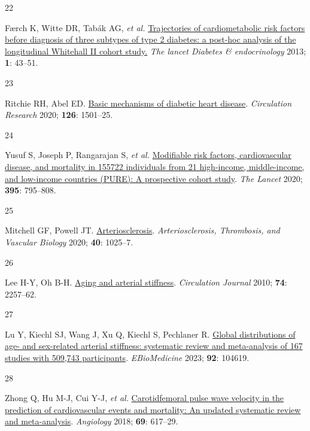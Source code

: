 \documentclass[
  a4paper,
  headsepline=true,
  open=any]{scrbook}
\newlength{\cslhangindent}
\newlength{\csllabelwidth}
\newlength{\cslentryspacingunit} %
\newenvironment{CSLReferences}[2] %
 {%
  \setlength{\parindent}{0pt}
  \ifodd #1
  \let\oldpar\par
  \def\par{\hangindent=\cslhangindent\oldpar}
  \fi
  \setlength{\parskip}{#2\cslentryspacingunit}
 }%
 {}
\newcommand{\CSLLeftMargin}[1]{\parbox[t]{\csllabelwidth}{#1}}
\newcommand{\CSLRightInline}[1]{\parbox[t]{\linewidth - \csllabelwidth}{#1}\break}
\begin{document}
\begin{CSLReferences}{0}{0}
\leavevmode{}%
\CSLLeftMargin{22 }%
\CSLRightInline{Færch K, Witte DR, Tabák AG, \emph{et al.}
\href{https://doi.org/10.1016/S2213-8587(13)70008-1}{Trajectories of
cardiometabolic risk factors before diagnosis of three subtypes of type
2 diabetes: a post-hoc analysis of the longitudinal Whitehall II cohort
study.} \emph{The lancet Diabetes \& endocrinology} 2013; \textbf{1}:
43--51.}

\leavevmode{}%
\CSLLeftMargin{23 }%
\CSLRightInline{Ritchie RH, Abel ED.
\href{https://doi.org/10.1161/CIRCRESAHA.120.315913}{Basic mechanisms of
diabetic heart disease}. \emph{Circulation Research} 2020; \textbf{126}:
1501--25.}

\leavevmode{}%
\CSLLeftMargin{24 }%
\CSLRightInline{Yusuf S, Joseph P, Rangarajan S, \emph{et al.}
\href{https://doi.org/10.1016/S0140-6736(19)32008-2}{Modifiable risk
factors, cardiovascular disease, and mortality in 155{\hphantom{,}}722
individuals from 21 high-income, middle-income, and low-income countries
(PURE): A prospective cohort study}. \emph{The Lancet} 2020;
\textbf{395}: 795--808.}

\leavevmode{}%
\CSLLeftMargin{25 }%
\CSLRightInline{Mitchell GF, Powell JT.
\href{https://doi.org/10.1161/ATVBAHA.120.314208}{Arteriosclerosis}.
\emph{Arteriosclerosis, Thrombosis, and Vascular Biology} 2020;
\textbf{40}: 1025--7.}

\leavevmode{}%
\CSLLeftMargin{26 }%
\CSLRightInline{Lee H-Y, Oh B-H.
\href{https://doi.org/10.1253/circj.CJ-10-0910}{Aging and arterial
stiffness}. \emph{Circulation Journal} 2010; \textbf{74}: 2257--62.}

\leavevmode{}%
\CSLLeftMargin{27 }%
\CSLRightInline{Lu Y, Kiechl SJ, Wang J, Xu Q, Kiechl S, Pechlaner R.
\href{https://doi.org/10.1016/j.ebiom.2023.104619}{Global distributions
of age- and sex-related arterial stiffness: systematic review and
meta-analysis of 167 studies with 509,743 participants}.
\emph{EBioMedicine} 2023; \textbf{92}: 104619.}

\leavevmode{}%
\CSLLeftMargin{28 }%
\CSLRightInline{Zhong Q, Hu M-J, Cui Y-J, \emph{et al.}
\href{https://doi.org/10.1177/0003319717742544}{Carotid{\textendash}femoral
pulse wave velocity in the prediction of cardiovascular events and
mortality: An updated systematic review and meta-analysis}.
\emph{Angiology} 2018; \textbf{69}: 617--29.}


\end{CSLReferences}
\end{document}

